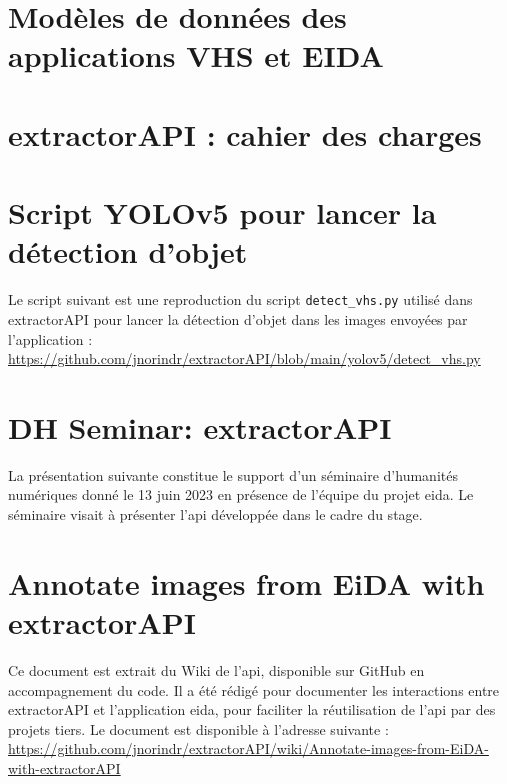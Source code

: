 \documentclass[a4paper,12pt,twoside]{book}
\newcommand{\api}{\gls{api}\xspace}
\newcommand{\eida}{\gls{eida}\xspace}
\newcommand{\exapi}{extractorAPI\xspace}
\newcommand{\clearemptydoublepage}{\newpage{\pagestyle{empty}\cleardoublepage}}
\begin{document}
    \chapter[Modèles de données EIDA/VHS]{\label{eidaDataModels}Modèles de données des applications VHS et EIDA}
	    
     	\clearemptydoublepage
    \chapter{\label{exapiCahier}extractorAPI : cahier des charges}
	    
	    \clearemptydoublepage
	\chapter{\label{yoloScript}Script YOLOv5 pour lancer la détection d'objet}
		Le script suivant est une reproduction du script \texttt{detect\_vhs.py} utilisé dans \exapi pour lancer la détection d'objet dans les images envoyées par l'application : \url{https://github.com/jnorindr/extractorAPI/blob/main/yolov5/detect_vhs.py}
		
	    \clearemptydoublepage
	\chapter{\label{DHSeminar}DH Seminar: extractorAPI}
		La présentation suivante constitue le support d'un séminaire d'humanités numériques donné le 13 juin 2023 en présence de l'équipe du projet \eida. Le séminaire visait à présenter l'\api développée dans le cadre du stage.
		
	    \clearemptydoublepage
	\chapter[Annotate images with extractorAPI]{\label{exapiAnno}Annotate images from EiDA with extractorAPI}
		Ce document est extrait du Wiki de l'\api, disponible sur GitHub en accompagnement du code. Il a été rédigé pour documenter les interactions entre \exapi et l'application \eida, pour faciliter la réutilisation de l'\api par des projets tiers. Le document est disponible à l'adresse suivante : \url{https://github.com/jnorindr/extractorAPI/wiki/Annotate-images-from-EiDA-with-extractorAPI}
		
		\clearemptydoublepage

\backmatter
    \printacronyms[title=Liste des acronymes,toctitle=Acronymes]
    \printglossary
    \listoffigures
    \clearemptydoublepage
    \tableofcontents
\end{document}
